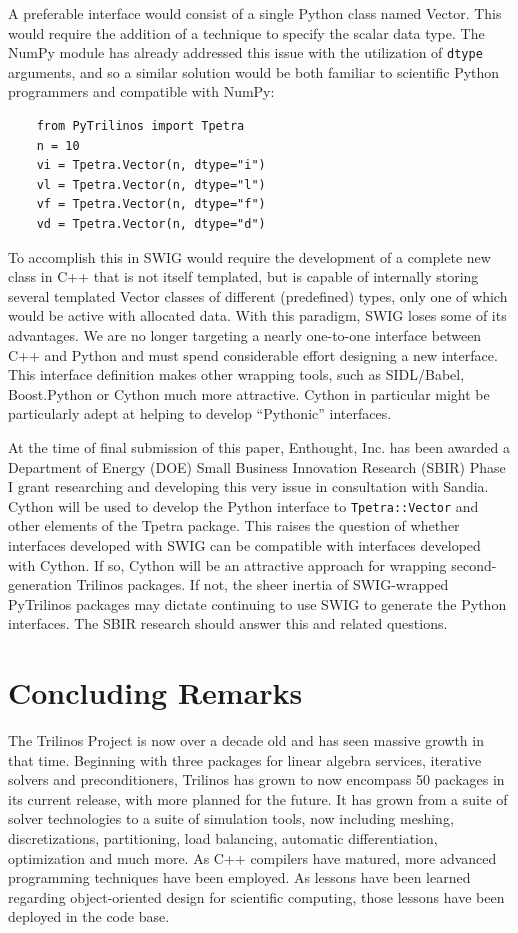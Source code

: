 \documentclass[11pt]{article}
\begin{document}
A preferable interface would consist of a single Python class named Vector.  This would require the addition of a technique to specify the scalar data type.  The NumPy module has already addressed this issue with the utilization of {\tt dtype} arguments, and so a similar solution would be both familiar to scientific Python programmers and compatible with NumPy:
\begin{verbatim}
    from PyTrilinos import Tpetra
    n = 10
    vi = Tpetra.Vector(n, dtype="i")
    vl = Tpetra.Vector(n, dtype="l")
    vf = Tpetra.Vector(n, dtype="f")
    vd = Tpetra.Vector(n, dtype="d")
\end{verbatim}
To accomplish this in SWIG would require the development of a complete new class in C++ that is not itself templated, but is capable of internally storing several templated Vector classes of different (predefined) types, only one of which would be active with allocated data.  With this paradigm, SWIG loses some of its advantages.  We are no longer targeting a nearly one-to-one interface between C++ and Python and must spend considerable effort designing a new interface.  This interface definition makes other wrapping tools, such as SIDL/Babel, Boost.Python or Cython much more attractive.  Cython in particular might be particularly adept at helping to develop ``Pythonic'' interfaces.

At the time of final submission of this paper, Enthought, Inc. has been awarded a Department of Energy (DOE) Small Business Innovation Research (SBIR) Phase I grant researching and developing this very issue in consultation with Sandia.  Cython will be used to develop the Python interface to {\tt Tpetra::Vector} and other elements of the Tpetra package.  This raises the question of whether interfaces developed with SWIG can be compatible with interfaces developed with Cython.  If so, Cython will be an attractive approach for wrapping second-generation Trilinos packages.  If not, the sheer inertia of SWIG-wrapped PyTrilinos packages may dictate continuing to use SWIG to generate the Python interfaces.  The SBIR research should answer this and related questions.

\section{Concluding Remarks}
\label{sec:concluding remarks}

The Trilinos Project is now over a decade old and has seen massive growth in that time.  Beginning with three packages for linear algebra services, iterative solvers and preconditioners, Trilinos has grown to now encompass 50 packages in its current release, with more planned for the future.  It has grown from a suite of solver technologies to a suite of simulation tools, now including meshing, discretizations, partitioning, load balancing, automatic differentiation, optimization and much more.  As C++ compilers have matured, more advanced programming techniques have been employed.  As lessons have been learned regarding object-oriented design for scientific computing, those lessons have been deployed in the code base.
\end{document}
